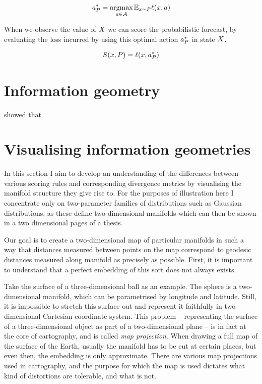 \begin{align}
	\action^{*}_{P} = \argmax_{\action\in\actionset} \expect{\x\sim P} \loss(\x,\action)
\end{align}

When we observe the value of $X$ we can score the probabilistic forecast, by evaluating the loss incurred by using this optimal action $a^{*}_{P}$ in state $X$.

\begin{align}
	S(x,P) = \ell(x,a^{*}_{P})
\end{align}

\chapter{Information geometry}

\cite{Dawid} showed that 

\chapter{Visualising information geometries}

In this section I aim to develop an understanding of the differences between various scoring rules and corresponding divergence metrics by visualising the manifold structure they give rise to. For the purposes of illustration here I concentrate only on two-parameter families of distributions such as Gaussian distributions, as these define two-dimensional manifolds which can then be shown in a two dimensional pages of a thesis.

Our goal is to create a two-dimensional map of particular manifolds in such a way that distances measured between points on the map correspond to geodesic distances measured along manifold as precisely as possible. First, it is important to understand that a perfect embedding of this sort does not always exists.

Take the surface of a three-dimensional ball as an example. The sphere is a two-dimensional manifold, which can be parametrised by longitude and latitude. Still, it is impossible to stretch this surface out and represent it faithfully in two dimensional Cartesian coordinate system. This problem -- representing the surface of a three-dimensional object as part of a two-dimensional plane -- is in fact at the core of cartography, and is called \emph{map projection}. When drawing a full map of the surface of the Earth, usually the manifold has to be cut at certain places, but even then, the embedding is only approximate. There are various map projections used in cartography, and the purpose for which the map is used dictates what kind of distortions are tolerable, and what is not.

